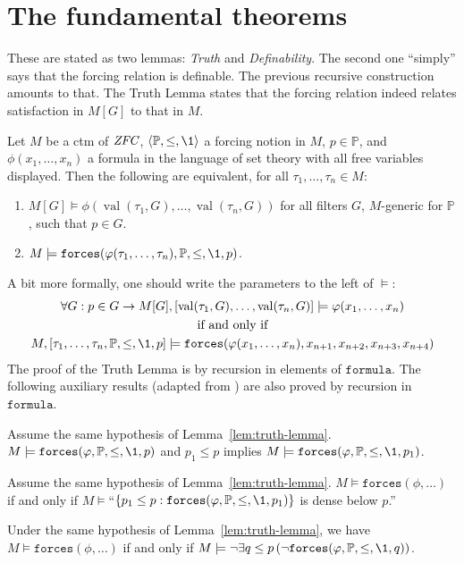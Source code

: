 \documentclass[11pt,english]{article}
\renewcommand{\PP}{\mathbb{P}}
\newcommand{\formula}{\ensuremath{\mathtt{formula}}}
\newcommand{\forceisa}{\mathtt{forces}}
\DeclareMathOperator{\val}{val}
\begin{document}
\section{The fundamental theorems}
These are stated as two lemmas: \emph{Truth} and
\emph{Definability}. The second one ``simply'' says that the forcing
relation is definable. The previous recursive construction amounts to
that. The Truth Lemma states that the forcing relation indeed relates
satisfaction in $M[G]$ to that in $M$. 
\begin{lemma}\label{lem:truth-lemma}
  Let $M$ be a ctm of $\mathit{ZFC}$, $\lb\PP,\leq,\1\rb$ a forcing notion
  in $M$, $p\in\PP$, and $\phi(x_1,\dots,x_n)$ a formula in the
  language of set 
  theory with all free variables displayed. Then the
  following are equivalent, for all $\tau_1,\dots,\tau_n\in M$: 
  \begin{enumerate}
  \item     $M[G]\models\phi(\val(\tau_1,G),\dots,\val(\tau_n,G))$ for
    all filters $G$, $M$-generic for $\PP$, such that $p\in G$.
  \item $M\models\forceisa(\phi(\tau_1,\dots,\tau_n),\PP,\leq,\1,p)$.
  \end{enumerate}
\end{lemma}
A bit more formally, one should write the parameters to the left of
$\models$:
\begin{gather*}
  \forall G : p\in G \limp M[G],[\val(\tau_1,G),\dots,\val(\tau_n,G)]
  \models\phi(x_1,\dots,x_n) \\
  \text{if and only if}\\
  M,[\tau_1,\dots,\tau_n,\PP,\leq,\1,p] 
  \models\forceisa(\phi(x_1,\dots,x_n),x_{n+1},x_{n+2},x_{n+3},x_{n+4})
\end{gather*}
The proof of the Truth Lemma is by recursion in elements of
$\formula$. The following auxiliary results (adapted from
\cite[IV.2.43]{kunen2011set}) are also proved by recursion in
$\formula$.
\begin{lemma}\label{lem:strengthen} 
  Assume the same hypothesis of Lemma~\ref{lem:truth-lemma}.
  $M\models\forceisa(\phi,\PP,\leq,\1,p)$ and $p_1\leq p$
  implies $M\models\forceisa(\phi,\PP,\leq,\1,p_1)$.
\end{lemma}
\begin{lemma}\label{lem:density}
  Assume the same hypothesis of Lemma~\ref{lem:truth-lemma}. $M\models\forceisa(\phi,\dots)$ if and only if
    $M\models$``$\{p_1\leq p : \forceisa(\phi,\PP,\leq,\1,p_1)\}$ is
    dense below $p$.''
\end{lemma}
\begin{lemma}\label{lem:forcing-negation}
  Under the same hypothesis of Lemma~\ref{lem:truth-lemma}, we have
  $M\models\forceisa(\phi,\dots)$ if and only if 
  $M\models\neg\exists
  q\leq p \,(\neg \forceisa(\phi,\PP,\leq,\1,q))$.
\end{lemma}
\end{document}
